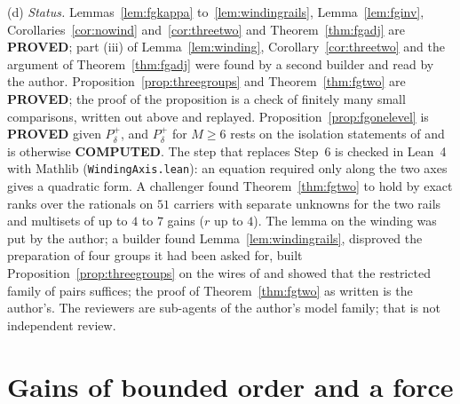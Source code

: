 \begin{remark}
(d) \emph{Status.} Lemmas~\ref{lem:fgkappa} to~\ref{lem:windingrails}, Lemma~\ref{lem:fginv}, Corollaries~\ref{cor:nowind} and~\ref{cor:threetwo} and Theorem~\ref{thm:fgadj} are \textbf{PROVED}; part (iii) of Lemma~\ref{lem:winding}, Corollary~\ref{cor:threetwo} and the argument of Theorem~\ref{thm:fgadj} were found by a second builder and read by the author. Proposition~\ref{prop:threegroups} and Theorem~\ref{thm:fgtwo} are \textbf{PROVED}; the proof of the proposition is a check of finitely many small comparisons, written out above and replayed. Proposition~\ref{prop:fgonelevel} is \textbf{PROVED} given $P^{+}_\delta$, and $P^{+}_\delta$ for $M\ge6$ rests on the isolation statements of \cite{dgone} and is otherwise \textbf{COMPUTED}. The step that replaces Step~6 is checked in Lean~4 with Mathlib (\texttt{WindingAxis.lean}): an equation required only along the two axes gives a quadratic form. A challenger found Theorem~\ref{thm:fgtwo} to hold by exact ranks over the rationals on $51$ carriers with separate unknowns for the two rails and multisets of up to $4$ to $7$ gains ($r$ up to $4$). The lemma on the winding was put by the author; a builder found Lemma~\ref{lem:windingrails}, disproved the preparation of four groups it had been asked for, built Proposition~\ref{prop:threegroups} on the wires of \cite{dgone} and showed that the restricted family of pairs suffices; the proof of Theorem~\ref{thm:fgtwo} as written is the author's. The reviewers are sub-agents of the author's model family; that is not independent review.
\end{remark}

\section{Gains of bounded order and a force}\label{sec:force}
